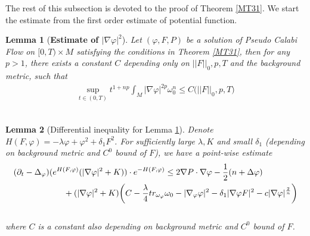 \documentclass[11pt]{amsart}
\newtheorem{lem}{Lemma}[section]
\numberwithin{equation}{section}
\begin{document}
\noindent
The rest of this subsection is devoted to the proof of Theorem \ref{MT31}. We start the estimate from the first order estimate of potential function. \\

\begin{lem}[\textbf{Estimate of $|\nabla\varphi|^2$}]\label{Lem311}
		Let $(\varphi,F,P)$ be a solution of Pseudo Calabi Flow on $[0,T)\times M$ satisfying the conditions in Theorem \ref{MT31}, then for any $p>1$,  there exists a constant $C$ depending only on $||F||_0, p, T$ and the background metric,  such that 
	\begin{align}
		 \sup_{t\in (0,T)} t^{1+np} \int_M |\nabla\varphi|^{2p}\omega_0^n \le  C\big(||F||_0,p,T\big)
	\end{align} \\
\end{lem}

\begin{lem}[Differential inequality for Lemma \ref{Lem311}]\label{Lem312}
	Denote $H(F,\varphi)=-\lambda \varphi+\varphi^2+\delta_1F^2$. For sufficiently large $\lambda, K$ and small $\delta_1$ (depending on background metric and $C^0$ bound of $F$), we have a point-wise estimate 
	\begin{align}\label{K1}
	&(\partial_t-\Delta_{\varphi})(e^{H(F,\varphi)}(|\nabla\varphi|^2+K))\cdot e^{-H(F,\varphi)}  \le  2\nabla P\cdot\nabla\varphi -\frac{1}{2}(n+\Delta\varphi)       \notag \\
	&\quad\quad\quad\quad\quad\quad +(|\nabla\varphi|^2+K)\bigg( C -\frac{\lambda}{4}tr_{\omega_{\varphi}}\omega_0 -|\nabla_\varphi\varphi|^2 -\delta_1|\nabla\varphi F|^2 - c|\nabla\varphi|^{\frac{2}{n}}\bigg)  
\end{align} \\
where $C$ is a constant also depending on background metric and $C^0$ bound of $F$. \\
\end{lem}
\end{document}
